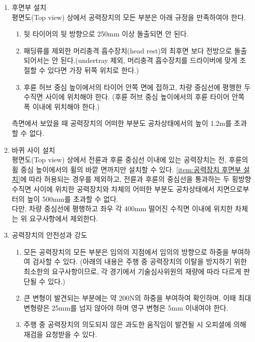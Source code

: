 \documentclass[final,a4paper,10pt]{report}
\begin{document}
\begin{enumerate}
  \item 후면부 설치\\ \label{item:공력장치 후면부 설치}
    평면도(Top view) 상에서 공력장치의 모든 부분은 아래 규정을 만족하여야 한다.
    \begin{enumerate}
      \item 뒷 타이어의 뒷 방향으로 250mm 이상 돌출되면 안 된다.
      \item 패딩류를 제외한 머리충격 흡수장치(head rest)의 최후면 보다 전방으로 돌출되어서는 안 된다.(undertray 제외, 머리충격 흡수장치를 드라이버에 맞게 조절할 수 있다면 가장 뒤쪽 위치로 한다.)
      \item 후륜 허브 중심 높이에서의 타이어 안쪽 면에 접하고, 차량 중심선에 평행한 두 수직면 사이에 위치해야 한다. (후륜 허브 중심 높이에서의 후륜 타이어 안쪽 폭 이내에 위치해야 한다.)
    \end{enumerate}
    측면에서 보았을 때 공력장치의 어떠한 부분도 공차상태에서의 높이 1.2m를 초과할 수 없다.
    
  \item 바퀴 사이 설치\\
    평면도(Top view) 상에서 전륜과 후륜 중심선 이내에 있는 공력장치는 전, 후륜의 휠 중심 높이에서의 휠의 바깥 면까지만 설치할 수 있다. \cref{item:공력장치 후면부 설치}에 따라 허용되는 경우를 제외하고, 전륜과 후륜의 중심선을 통과하는 두 횡방향 수직면 사이에 위치한 공력장치와 차체의 어떠한 부분도 공차상태에서 지면으로부터의 높이 500mm를 초과할 수 없다.\\
    다만, 차량 중심선에 평행하고 좌우 각 400mm 떨어진 수직면 이내에 위치한 차체는 위 요구사항에서 제외한다.
    
  \item 공력장치의 안전성과 강도 \label{item:공력장치의 안전성과 강도}
    \begin{enumerate}
      \item 모든 공력장치의 모든 부분은 임의의 지점에서 임의의 방향으로 하중을 부여하여 검사할 수 있다. (아래의 내용은 주행 중 공력장치의 이탈을 방지하기 위한 최소한의 요구사항이므로, 각 경기에서 기술심사위원의 재량에 따라 다르게 판단될 수 있다.)
      \item 큰 변형이 발견되는 부분에는 약 200N의 하중을 부여하여 확인하며, 이때 최대 변형량은 25mm를 넘지 않아야 하며 영구 변형은 5mm 이내여야 한다.
      \item 주행 중 공력장치의 의도되지 않은 과도한 움직임이 발견될 시 오피셜에 의해 재검을 요청받을 수 있다.
    \end{enumerate}
\end{enumerate}
\end{document}
